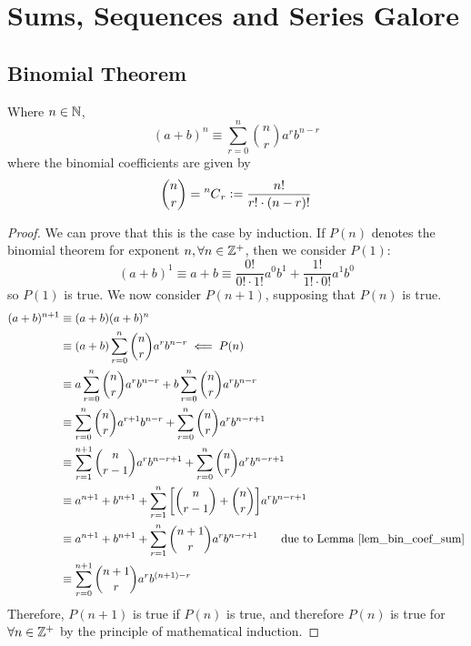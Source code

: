 \section{Sums, Sequences and Series Galore}

\subsection{Binomial Theorem}

\begin{theorem} Where \(n \in \mathbb N\),
\begin{equation*}
(a + b)^n \equiv \sum_{r = 0}^n \binom nr a^r b^{n - r}
\end{equation*}
where the binomial coefficients are given by
\begin{equation*}
\binom nr = \prescript{n\mkern-0.5mu}{}C_{r} \vcentcolon= \frac{n!}{r!\cdot(n - r)!}
\end{equation*}
\end{theorem}
\begin{proof}
We can prove that this is the case by induction. If \(P(n)\) denotes the
binomial theorem for exponent \(n, \forall n \in \mathbb Z^+\), then we
consider \(P(1)\):
\begin{equation*}
(a + b)^1 \equiv a + b
    \equiv \frac{0!}{0!\cdot 1!} a^0b^1 + \frac{1!}{1!\cdot 0!} a^1b^0
\end{equation*}
so \(P(1)\) is true. We now consider \(P(n + 1)\), supposing that \(P(n)\)
is true.
\begin{align*}
(a + b)^{n + 1} &\equiv (a + b)(a + b)^n \\
    &\equiv (a + b)\sum_{r = 0}^n \binom nr a^r b^{n - r}
        \impliedby P(n) \\
    &\equiv a\sum_{r = 0}^n \binom nr a^r b^{n - r}
          + b\sum_{r = 0}^n \binom nr a^r b^{n - r} \\
    &\equiv \sum_{r = 0}^n \binom nr a^{r + 1} b^{n - r}
          + \sum_{r = 0}^n \binom nr a^r b^{n - r + 1} \\
    &\equiv \sum_{r = 1}^{n + 1} \binom n{r - 1} a^{r} b^{n - r + 1}
          + \sum_{r = 0}^n \binom nr a^r b^{n - r + 1} \\
    &\equiv a^{n + 1} + b^{n + 1}
          + \sum_{r = 1}^n \bqty{\binom n{r - 1} + \binom nr}
            a^r b^{n - r + 1} \\
    &\equiv a^{n + 1} + b^{n + 1}
          + \sum_{r = 1}^n \binom{n + 1}r a^r b^{n - r + 1}
            \qquad \text{due to Lemma \ref{lem_bin_coef_sum}} \\
    &\equiv \sum_{r = 0}^{n + 1} \binom{n + 1}r a^r b^{(n + 1) - r} \\
\end{align*}
Therefore, \(P(n + 1)\) is true if \(P(n)\) is true, and therefore \(P(n)\) is
true for \(\forall n \in \mathbb Z^+\) by the principle of mathematical
induction.
\end{proof}

